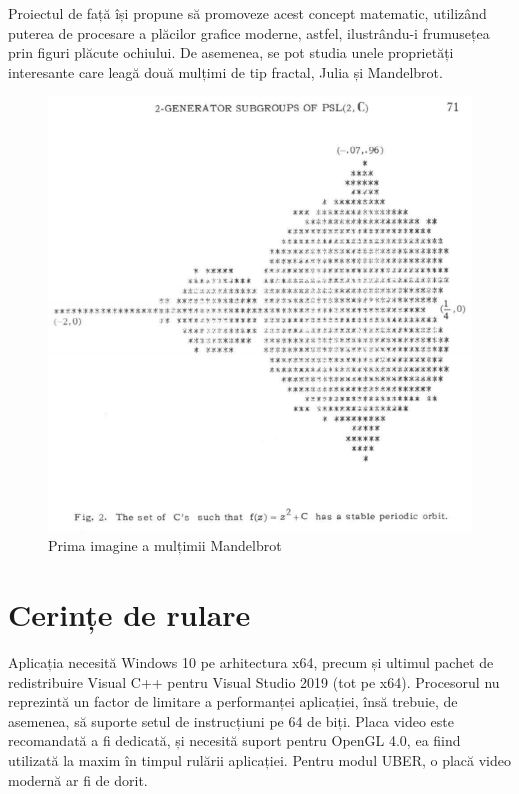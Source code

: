 \documentclass[12pt]{report}
\begin{document}
Proiectul de față își propune să promoveze acest concept matematic, utilizând puterea de procesare a plăcilor grafice moderne, astfel, ilustrându-i frumusețea prin figuri plăcute ochiului.
De asemenea, se pot studia unele proprietăți interesante care leagă două mulțimi de tip fractal, Julia și Mandelbrot.

\begin{figure}
	\centering
	\includegraphics[scale=0.65]{Images/mandelbrot.png}
	\caption{Prima imagine a mulțimii Mandelbrot}
\end{figure}

\chapter{Cerințe de rulare}

Aplicația necesită Windows 10 pe arhitectura x64, precum și ultimul pachet de redistribuire Visual C++ pentru Visual Studio 2019 (tot pe x64).
Procesorul nu reprezintă un factor de limitare a performanței aplicației, însă trebuie, de asemenea, să suporte setul de instrucțiuni pe 64 de biți.
Placa video este recomandată a fi dedicată, și necesită suport pentru OpenGL 4.0, ea fiind utilizată la maxim în timpul rulării aplicației. Pentru modul UBER,
o placă video modernă ar fi de dorit.
\end{document}

